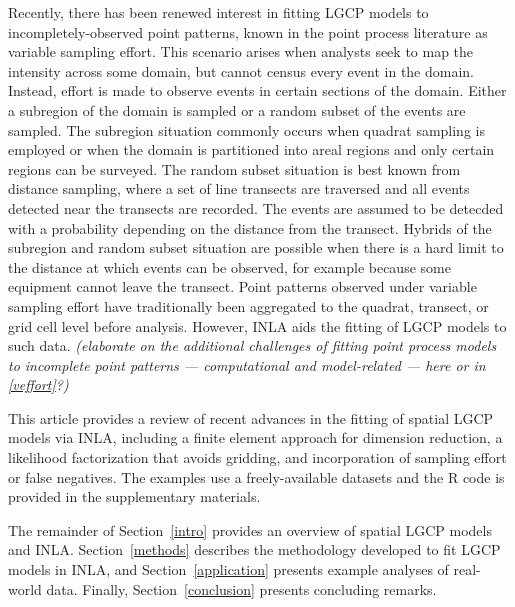 \documentclass[]{interact}
\begin{document}

Recently, there has been renewed interest in fitting LGCP models to
incompletely-observed point patterns, known in the point process literature as
variable sampling effort. This scenario arises when analysts seek to map the
intensity across some domain, but cannot census every event in the domain.
Instead, effort is made to observe events in certain sections of the domain.
Either a subregion of the domain is sampled or a random subset of the events
are sampled. The subregion situation commonly occurs when quadrat sampling is
employed or when the domain is partitioned into areal regions and only certain
regions can be surveyed. The random subset situation is best known from
distance sampling, where a set of line transects are traversed and all events
detected near the transects are recorded. The events are assumed to be detecded
with a probability depending on the distance from the transect. Hybrids of the
subregion and random subset situation are possible when there is a hard limit
to the distance at which events can be observed, for example because some
equipment cannot leave the transect. Point patterns observed under variable
sampling effort have traditionally been aggregated to the quadrat, transect,
or grid cell level before analysis. However, INLA aids the fitting of LGCP
models to such data.
{\it (elaborate on the additional challenges of fitting point process models
to incomplete point patterns --- computational and model-related --- here or
in \ref{veffort}?)}

This article provides a review of recent advances in the fitting of spatial
LGCP models via INLA, including a finite element approach for dimension
reduction, a likelihood factorization that avoids gridding, and incorporation
of sampling effort or false negatives. The examples use a freely-available
datasets and the R code is provided in the supplementary materials.

The remainder of Section~\ref{intro} provides an overview of spatial LGCP
models and INLA. Section~\ref{methods} describes the methodology developed to
fit LGCP models in INLA, and Section~\ref{application} presents example
analyses of real-world data. Finally, Section~\ref{conclusion} presents
concluding remarks.
\end{document}
